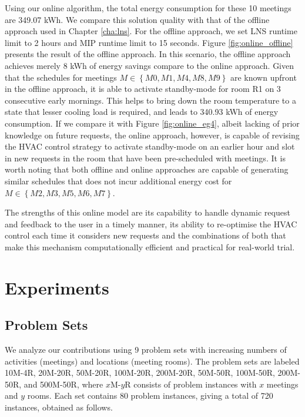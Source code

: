Using our online algorithm, the total energy consumption for these 10 meetings are 349.07 kWh. We compare this solution quality with that of the offline approach used in Chapter \ref{cha:lns}. For the offline approach, we set LNS runtime limit to 2 hours and MIP runtime limit to 15 seconds. Figure \ref{fig:online_offline} presents the result of the offline approach. In this scenario, the offline approach achieves merely 8 kWh of energy savings compare to the online approach. 
Given that the schedules for meetings $M \in \left\{M0, M1, M4, M8, M9\right\}$ are known upfront in the offline approach, it is able to activate standby-mode for room R1 on 3 consecutive early mornings. This helps to bring down the room temperature to a state that lesser cooling load is required, and leads to 340.93 kWh of energy consumption. 
If we compare it with Figure \ref{fig:online_eg4}, albeit lacking of prior knowledge on future requests, the online approach, however, is capable of revising the HVAC control strategy to activate standby-mode on an earlier hour and slot in new requests in the room that have been pre-scheduled with meetings. 
It is worth noting that both offline and online approaches are capable of generating similar schedules that does not incur additional energy cost for $M \in \left\{M2, M3, M5, M6, M7\right\}$. 

The strengths of this online model are its capability to handle dynamic request and feedback to the user in a timely manner, its ability to re-optimise the HVAC control each time it considers new requests and the combinations of both that make this mechanism computationally efficient and practical for real-world trial.


\section{Experiments} \label{sec:online:experiments}
\subsection{Problem Sets}

We analyze our contributions using 9 problem sets with increasing numbers of activities (meetings) and locations (meeting rooms). The problem sets are labeled 10M-4R, 20M-20R, 50M-20R, 100M-20R, 200M-20R, 50M-50R, 100M-50R, 200M-50R, and 500M-50R, where $x$M-$y$R consists of problem instances with $x$ meetings and $y$ rooms. Each set contains 80 problem instances, giving a total of 720 instances, obtained as follows. 


